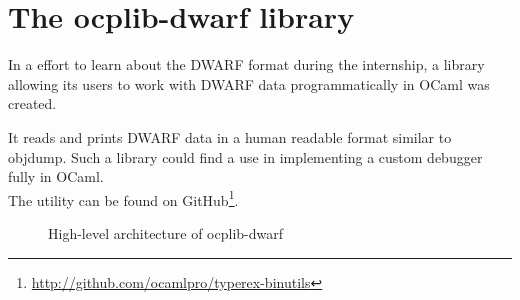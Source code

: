 \section{The ocplib-dwarf library}

In a effort to learn about the DWARF format during the internship, a library
allowing its users to work with DWARF data programmatically in OCaml was
created.

\vspace{5mm}

It reads and prints DWARF data in a human readable format similar to objdump.
Such a library could find a use in implementing a custom debugger fully in
OCaml.\\
The utility can be found on
GitHub\footnote{\url{http://github.com/ocamlpro/typerex-binutils}}.

\begin{figure}
\centering
{}

\caption{High-level architecture of ocplib-dwarf}
\end{figure}

